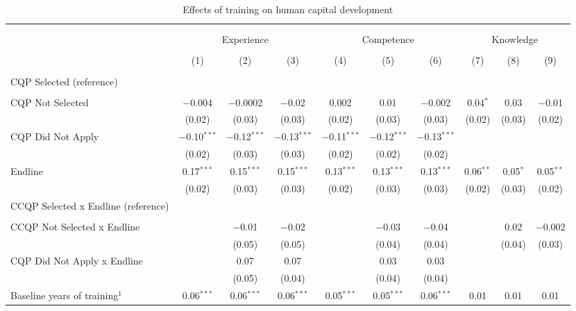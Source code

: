 \documentclass[
  a4paper, twoside, 12pt]{book}
\renewcommand{\hl}[1]{#1}
\begin{document}
\begin{singlespacing}

\begin{table}[H] \centering 
  \caption{Effects of training on human capital development} 
  \label{tab:tbl-appreg} 
\scriptsize 
\begin{tabular}{@{\extracolsep{-8pt}}lccccccccc} 
\\[-1.8ex]\hline 
\hline \\[-1.8ex] 
\\[-1.8ex] & \multicolumn{3}{c}{Experience} & \multicolumn{3}{c}{Competence} & \multicolumn{3}{c}{Knowledge} \\ 
\\[-1.8ex] & (1) & (2) & (3) & (4) & (5) & (6) & (7) & (8) & (9)\\ 
\hline \\[-1.8ex] 
 CQP Selected (reference) \\ \\ CQP Not Selected & $-$0.004 & $-$0.0002 & $-$0.02 & 0.002 & 0.01 & $-$0.002 & 0.04$^{*}$ & 0.03 & $-$0.01 \\ 
  & (0.02) & (0.03) & (0.03) & (0.02) & (0.03) & (0.03) & (0.02) & (0.03) & (0.02) \\ 
  CQP Did Not Apply & $-$0.10$^{***}$ & $-$0.12$^{***}$ & $-$0.13$^{***}$ & $-$0.11$^{***}$ & $-$0.12$^{***}$ & $-$0.13$^{***}$ &  &  &  \\ 
  & (0.02) & (0.03) & (0.03) & (0.02) & (0.02) & (0.02) &  &  &  \\ 
  Endline & 0.17$^{***}$ & 0.15$^{***}$ & 0.15$^{***}$ & 0.13$^{***}$ & 0.13$^{***}$ & 0.13$^{***}$ & 0.06$^{**}$ & 0.05$^{*}$ & 0.05$^{**}$ \\ 
  & (0.02) & (0.03) & (0.03) & (0.02) & (0.03) & (0.03) & (0.02) & (0.03) & (0.02) \\ 
  \hl{CCQP Selected x Endline (reference)} \\ \\ \hl{CCQP Not Selected x Endline} &  & $-$0.01 & $-$0.02 &  & $-$0.03 & $-$0.04 &  & 0.02 & $-$0.002 \\ 
  &  & (0.05) & (0.05) &  & (0.04) & (0.04) &  & (0.04) & (0.03) \\ 
  CQP Did Not Apply x Endline &  & 0.07 & 0.07 &  & 0.03 & 0.03 &  &  &  \\ 
  &  & (0.05) & (0.04) &  & (0.04) & (0.04) &  &  &  \\ 
  Baseline years of training$^1$ & 0.06$^{***}$ & 0.06$^{***}$ & 0.06$^{***}$ & 0.05$^{***}$ & 0.05$^{***}$ & 0.06$^{***}$ & 0.01 & 0.01 & 0.01 \\ 

\end{tabular}
\end{table}
\end{singlespacing}
\end{document}
